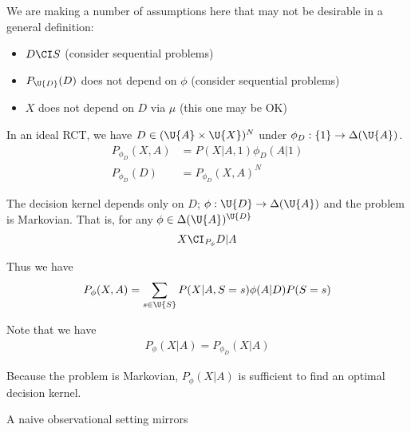 We are making a number of assumptions here that may not be desirable in a general definition:
\begin{itemize}
    \item $D\CI S$ (consider sequential problems)
    \item $P_{\U{D}}(D)$ does not depend on $\phi$ (consider sequential problems)
    \item $X$ does not depend on $D$ via $\mu$ (this one may be OK)
\end{itemize}

\begin{example}

In an ideal RCT, we have $D\in (\U{A}\times\U{X})^{N}$ under $\phi_D:\{1\}\to \Delta(\U{A})$.
\begin{align}
    P_{\phi_D}(X,A) &= P(X| A,1)\phi_D(A|1)\\
    P_{\phi_D}(D) &= P_{\phi_D}(X,A)^N
\end{align}

The decision kernel depends only on $D$; $\phi:\U{D}\to \Delta(\U{A})$ and the problem is Markovian. That is, for any $\phi\in \Delta(\U{A})^{\U{D}}$
\begin{align}
    X\CI_{P_\phi} D | A
\end{align}

Thus we have
\begin{align}
    P_{\phi}(X,A) &= \sum_{s\in\U{S}} P(X|A,S=s)\phi(A|D)P(S=s)\\
\end{align}

Note that we have
\begin{align}
    P_\phi(X|A) = P_{\phi_D}(X|A)
\end{align}

Because the problem is Markovian, $P_\phi(X|A)$ is sufficient to find an optimal decision kernel.

\end{example}

\begin{example}

A naive observational setting mirrors 

\end{example}


